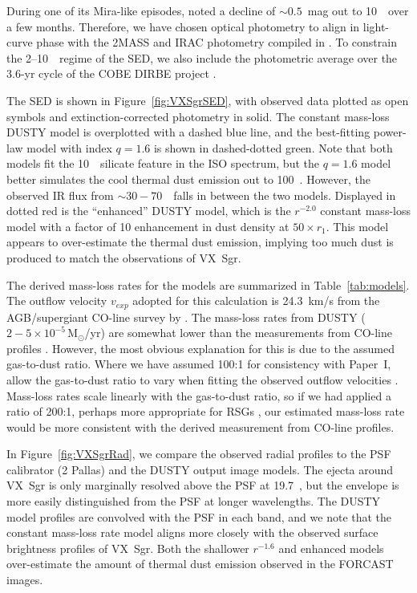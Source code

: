 \documentclass[modern]{aastex61}
\begin{document}
During one of its Mira-like episodes, \cite{humphreys1972} noted a decline of $\sim0.5$~mag out to 10~\micron\ over a few months. Therefore, we have chosen optical photometry to align in light-curve phase with the 2MASS and IRAC photometry compiled in \cite{smith2004}.  To constrain the 2--10~\micron\ regime of the SED, we also include the photometric average over the 3.6-yr cycle of the COBE DIRBE project \citep{price2010}.

The SED is shown in Figure~\ref{fig:VXSgrSED}, with observed data plotted as open symbols and extinction-corrected photometry in solid. The constant mass-loss DUSTY model is overplotted with a dashed blue line, and the best-fitting power-law model with index $q=1.6$ is shown in dashed-dotted green. Note that both models fit the 10~\micron\ silicate feature in the ISO spectrum, but the $q=1.6$ model better simulates the cool thermal dust emission out to 100~\micron.  However, the observed IR flux from $\sim30-70$~\micron\ falls in between the two models. Displayed in dotted red is the ``enhanced'' DUSTY model, which is the $r^{-2.0}$ constant mass-loss model with a factor of 10 enhancement in dust density at $50\times r_1$.  This model appears to over-estimate the thermal dust emission, implying too much dust is produced to match the observations of VX~Sgr.

The derived mass-loss rates for the models are summarized in Table~\ref{tab:models}.  The outflow velocity $v_{exp}$ adopted for this calculation is 24.3~km/s from the AGB/supergiant CO-line survey by \cite{debeck2010}.  The mass-loss rates from DUSTY ($2-5\times10^{-5}\,\mathrm{M}_\odot$/yr) are somewhat lower than the measurements from CO-line profiles \citep[$6.1\times10^{-5}\,\mathrm{M}_\odot$/yr;][]{debeck2010}.  However, the most obvious explanation for this is due to the assumed gas-to-dust ratio. Where we have assumed 100:1 for consistency with Paper~I, \cite{debeck2010} allow the gas-to-dust ratio to vary when fitting the observed outflow velocities \citep[using GASTRoNOoM;][]{decin2006}.  Mass-loss rates scale linearly with the gas-to-dust ratio, so if we had applied a ratio of 200:1, perhaps more appropriate for RSGs \citep{decin2006,mauron2011}, our estimated mass-loss rate would be more consistent with the derived measurement from CO-line profiles.

In Figure~\ref{fig:VXSgrRad}, we compare the observed radial profiles to the PSF calibrator (2 Pallas) and the DUSTY output image models.  The ejecta around VX~Sgr is only marginally resolved above the PSF at 19.7~\micron, but the envelope is more easily distinguished from the PSF at longer wavelengths.  The DUSTY model profiles are convolved with the PSF in each band, and we note that the constant mass-loss rate model aligns more closely with the observed surface brightness profiles of VX~Sgr.  Both the shallower $r^{-1.6}$ and enhanced models over-estimate the amount of thermal dust emission observed in the FORCAST images.
\end{document}

